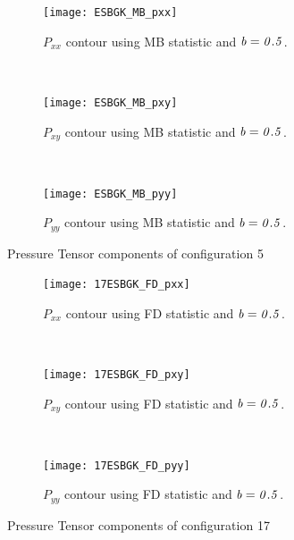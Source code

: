 \documentclass{rsproca}%
\begin{document}
\begin{figure}
        \centering
        \begin{subfigure}[b]{0.32\textwidth}
                \centering
                \texttt{[image: ESBGK\_MB\_pxx]}
                \caption{$P_{xx}$ contour using MB statistic and $\it{b=0.5}$.}
                \label{fig:5ESBGK_MB_pxx}
        \end{subfigure}%
        ~ %
        \begin{subfigure}[b]{0.32\textwidth}
                \centering
                \texttt{[image: ESBGK\_MB\_pxy]}
                \caption{$P_{xy}$ contour using MB statistic and $\it{b=0.5}$.}
                \label{fig:5ESBGK_MB_pxy}
        \end{subfigure}
        ~ %
        \begin{subfigure}[b]{0.32\textwidth}
                \centering
                \texttt{[image: ESBGK\_MB\_pyy]}
                \caption{$P_{yy}$ contour using MB statistic and $\it{b=0.5}$.}
                \label{fig:5ESBGK_MB_pyy}
        \end{subfigure}
        \caption{Pressure Tensor components of configuration 5}\label{fig:conf5_pTensor}
\end{figure}

\begin{figure}
        \centering
        \begin{subfigure}[b]{0.32\textwidth}
                \centering
                \texttt{[image: 17ESBGK\_FD\_pxx]}
                \caption{$P_{xx}$ contour using FD statistic and $\it{b=0.5}$.}
                \label{fig:17ESBGK_FD_pxx}
        \end{subfigure}%
        ~ %
        \begin{subfigure}[b]{0.32\textwidth}
                \centering
                \texttt{[image: 17ESBGK\_FD\_pxy]}
                \caption{$P_{xy}$ contour using FD statistic and $\it{b=0.5}$.}
                \label{fig:17ESBGK_FD_pxy}
        \end{subfigure}
        ~ %
        \begin{subfigure}[b]{0.32\textwidth}
                \centering
                \texttt{[image: 17ESBGK\_FD\_pyy]}
                \caption{$P_{yy}$ contour using FD statistic and $\it{b=0.5}$.}
                \label{fig:17ESBGK_FD_pyy}
        \end{subfigure}
        \caption{Pressure Tensor components of configuration 17}\label{fig:conf5_pTensor}
\end{figure}
\end{document}

